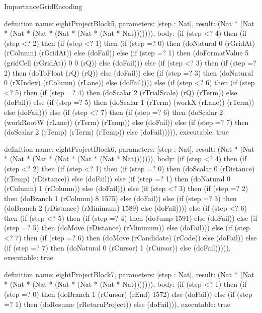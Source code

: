 \begin{lexlean}{ImportanceGridEncoding}
\begin{semanticmodule}
definition{
  name: eightProjectBlock5,
  parameters: [step : Nat],
  result: (Nat * (Nat * (Nat * (Nat * (Nat * (Nat * (Nat * Nat))))))),
  body: (if (step <? 4) then
      (if (step <? 2) then
      (if (step <? 1) then
      (if (step =? 0) then (doNatural 0 (rGridAt) (rColumn) (rGridAt)) else (doFail)) else
      (if (step =? 1) then (doFormatValue 5 (gridCell (rGridAt)) 0 0 (rQ)) else (doFail))) else
      (if (step <? 3) then
      (if (step =? 2) then (doToFloat (rQ) (rQ)) else (doFail)) else
      (if (step =? 3) then (doNatural 0 (rXIndex) (rColumn) (rLane)) else (doFail)))) else
      (if (step <? 6) then
      (if (step <? 5) then
      (if (step =? 4) then (doScalar 2 (rTrialScale) (rQ) (rTerm)) else (doFail)) else
      (if (step =? 5) then (doScalar 1 (rTerm) (workX (rLane)) (rTerm)) else (doFail))) else
      (if (step <? 7) then
      (if (step =? 6) then (doScalar 2 (workRootW (rLane)) (rTerm) (rTemp)) else (doFail)) else
      (if (step =? 7) then (doScalar 2 (rTemp) (rTerm) (rTemp)) else (doFail))))),
  executable: true
}

definition{
  name: eightProjectBlock6,
  parameters: [step : Nat],
  result: (Nat * (Nat * (Nat * (Nat * (Nat * (Nat * (Nat * Nat))))))),
  body: (if (step <? 4) then
      (if (step <? 2) then
      (if (step <? 1) then
      (if (step =? 0) then (doScalar 0 (rDistance) (rTemp) (rDistance)) else (doFail)) else
      (if (step =? 1) then (doNatural 0 (rColumn) 1 (rColumn)) else (doFail))) else
      (if (step <? 3) then
      (if (step =? 2) then (doBranch 1 (rColumn) 8 1575) else (doFail)) else
      (if (step =? 3) then (doBranch 2 (rDistance) (rMinimum) 1589) else (doFail)))) else
      (if (step <? 6) then
      (if (step <? 5) then
      (if (step =? 4) then (doJump 1591) else (doFail)) else
      (if (step =? 5) then (doMove (rDistance) (rMinimum)) else (doFail))) else
      (if (step <? 7) then
      (if (step =? 6) then (doMove (rCandidate) (rCode)) else (doFail)) else
      (if (step =? 7) then (doNatural 0 (rCursor) 1 (rCursor)) else (doFail))))),
  executable: true
}

definition{
  name: eightProjectBlock7,
  parameters: [step : Nat],
  result: (Nat * (Nat * (Nat * (Nat * (Nat * (Nat * (Nat * Nat))))))),
  body: (if (step <? 1) then
      (if (step =? 0) then (doBranch 1 (rCursor) (rEnd) 1572) else (doFail)) else
      (if (step =? 1) then (doResume (rReturnProject)) else (doFail))),
  executable: true
}


\end{semanticmodule}
\end{lexlean}
